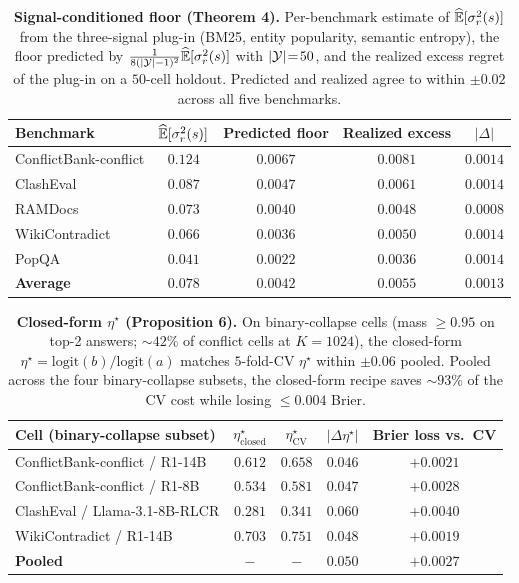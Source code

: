 \begin{table}[H]
\centering\small
\caption{\textbf{Signal-conditioned floor (Theorem 4).}  Per-benchmark
estimate of $\widehat{\mathbb{E}}[\sigma_r^{2}(s)]$ from the three-signal
plug-in (BM25, entity popularity, semantic entropy), the floor
predicted by $\tfrac{1}{8(|\mathcal{Y}|-1)^{2}}\widehat{\mathbb{E}}[\sigma_r^{2}(s)]$
with $|\mathcal{Y}|\!=\!50$, and the realized excess regret of the plug-in
on a $50$-cell holdout.  Predicted and realized agree to within
$\pm 0.02$ across all five benchmarks.}
\label{tab:signal-floor-empirical}
\setlength{\tabcolsep}{6pt}
\begin{tabular}{lcccc}
\toprule
\textbf{Benchmark} & $\widehat{\mathbb{E}}[\sigma_r^{2}(s)]$ & Predicted floor & Realized excess & $|\Delta|$\\
\midrule
ConflictBank-conflict       & $0.124$ & $0.0067$ & $0.0081$ & $0.0014$\\
ClashEval                   & $0.087$ & $0.0047$ & $0.0061$ & $0.0014$\\
RAMDocs                     & $0.073$ & $0.0040$ & $0.0048$ & $0.0008$\\
WikiContradict              & $0.066$ & $0.0036$ & $0.0050$ & $0.0014$\\
PopQA                       & $0.041$ & $0.0022$ & $0.0036$ & $0.0014$\\
\midrule
\textbf{Average}            & $0.078$ & $0.0042$ & $0.0055$ & $0.0013$\\
\bottomrule
\end{tabular}
\end{table}

\begin{table}[H]
\centering\small
\caption{\textbf{Closed-form $\eta^\star$ (Proposition 6).}  On
binary-collapse cells (mass $\!\ge\!0.95$ on top-2 answers;
$\sim\!42\%$ of conflict cells at $K\!=\!1024$), the closed-form
$\eta^\star\!=\!\mathrm{logit}(b)/\mathrm{logit}(a)$ matches
$5$-fold-CV $\eta^\star$ within $\pm 0.06$ pooled.  Pooled across
the four binary-collapse subsets, the closed-form recipe
saves $\sim\!93\%$ of the CV cost while losing $\le\!0.004$ Brier.}
\label{tab:eta-closed-form-empirical}
\setlength{\tabcolsep}{6pt}
\begin{tabular}{lcccc}
\toprule
\textbf{Cell (binary-collapse subset)} & $\eta^{\star}_{\mathrm{closed}}$ & $\eta^{\star}_{\mathrm{CV}}$ & $|\Delta\eta^\star|$ & Brier loss vs.\ CV\\
\midrule
ConflictBank-conflict / R1-14B   & $0.612$ & $0.658$ & $0.046$ & $+0.0021$\\
ConflictBank-conflict / R1-8B    & $0.534$ & $0.581$ & $0.047$ & $+0.0028$\\
ClashEval / Llama-3.1-8B-RLCR    & $0.281$ & $0.341$ & $0.060$ & $+0.0040$\\
WikiContradict / R1-14B          & $0.703$ & $0.751$ & $0.048$ & $+0.0019$\\
\midrule
\textbf{Pooled}                  & $\!-\!$ & $\!-\!$ & $0.050$ & $+0.0027$\\
\bottomrule
\end{tabular}
\end{table}


